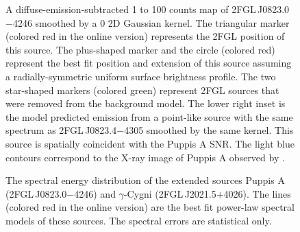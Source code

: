 \documentclass[12pt,preprint]{aastex}
\newif\ifcolorfigure
\newcommand{\gev}{\text{GeV}\xspace}
\newcommand{\rosat}{\text{{\em ROSAT}}\xspace}
\begin{document}
\begin{figure}
    \ifcolorfigure
      \plotone{source_plots/source_Puppis_A_color.eps}
    \else
    \fi
  \caption{A diffuse-emission-subtracted 1 \gev to 100 \gev counts map
  of 2FGL\,J0823.0$-$4246 smoothed by a 0 2D
  Gaussian kernel.  The triangular marker 
  (colored red in the online version)
  represents the 2FGL position of this source.  The plus-shaped
  marker and the circle (colored
  red) represent 
  the best fit position and extension of this source assuming a
  radially-symmetric uniform surface brightness profile.  The two 
  star-shaped markers (colored
  green) represent 2FGL sources that were
  removed from the background model.
  The lower right inset is the model predicted emission from a point-like
  source with the same spectrum as 2FGL\,J0823.4$-$4305 smoothed by the
  same kernel.  This source is spatially coincident with the Puppis A
  SNR. The light blue contours correspond to the X-ray image of Puppis
  A observed by \rosat \citep{rosat_puppis_a}.
  }\label{1FGL_J0823.3-4248}
\end{figure}

\clearpage
\begin{figure}
    \ifcolorfigure
      \plotone{summary_plots/snr_seds_color.eps}
    \else
    \fi
    \caption{
    The spectral energy distribution of the extended sources 
    Puppis A (2FGL\,J0823.0$-$4246) and $\gamma$-Cygni 
    (2FGL\,J2021.5+4026).
    The lines (colored red in the online version)
    are the best fit power-law spectral models of
    these sources.
    The spectral errors are statistical only.
    }
    \label{snr_seds}
  \end{figure}
\end{document}
